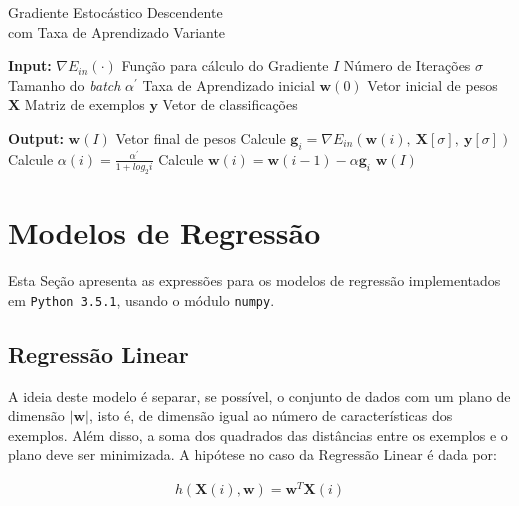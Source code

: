 \documentclass[a4paper, 12pt]{article}
\begin{document}
\begin{algorithm}[htpb]
    \caption{Gradiente Estocástico Descendente \\ com Taxa de Aprendizado Variante}
    \label{alg:GSD}
    \begin{algorithmic}[1]
        \Statex \item[\textbf{Input:}]
        \Statex $\nabla{}E_{in}(\cdot)$ \Comment Função para cálculo do Gradiente
        \Statex $I$ \Comment Número de Iterações
        \Statex $\sigma$ \Comment Tamanho do \textit{batch}
        \Statex $\alpha^{\prime}$ \Comment Taxa de Aprendizado inicial
        \Statex $\textbf{w}(0)$ \Comment Vetor inicial de pesos
        \Statex $\textbf{X}$ \Comment Matriz de exemplos
        \Statex $\textbf{y}$ \Comment Vetor de classificações
        \Statex \item[\textbf{Output:}]
        \Statex $\textbf{w}(I)$ \Comment Vetor final de pesos
        \Statex
        \State Calcule $\textbf{g}_i = \nabla{}E_{in}(\textbf{w}(i),\: \textbf{X}[\sigma],\: \textbf{y}[\sigma])$
        \State Calcule $\alpha(i) = \frac{\alpha^{\prime}}{1 + log_{2}i}$
        \State Calcule $\textbf{w}(i) = \textbf{w}(i -1) - \alpha{}\textbf{g}_i$
        \EndFor
        \State \Return $\textbf{w}(I)$
    \end{algorithmic}
\end{algorithm}


\section{Modelos de Regressão} \label{sec:regr}

Esta Seção apresenta as expressões para os modelos de regressão implementados
em \texttt{Python 3.5.1}, usando o módulo \texttt{numpy}.

\subsection{Regressão Linear}

A ideia deste modelo é separar, se possível, o conjunto de dados com um plano
de dimensão $|\textbf{w}|$, isto é, de dimensão igual ao número de
características dos exemplos. Além disso, a soma dos quadrados das distâncias
entre os exemplos e o plano deve ser minimizada.
A hipótese no caso da Regressão Linear é dada por:

\begin{align*}
    h(\textbf{X}(i),\textbf{w}) = \textbf{w}^{T}\textbf{X}(i)
\end{align*}
\end{document}
